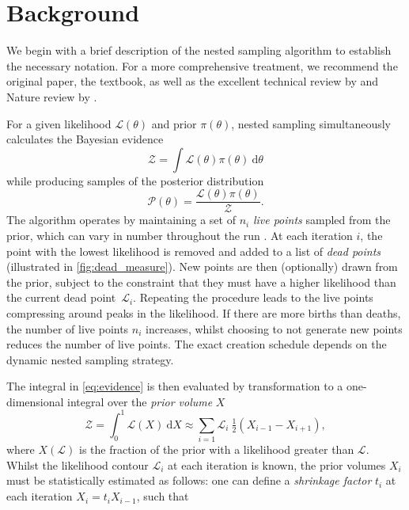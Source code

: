 \documentclass[usenatbib]{mnras}
\newcommand{\nlive}{n_i}
\begin{document}
\section{Background}\label{sec:background}
We begin with a brief description of the nested sampling algorithm to establish the necessary notation. For a more comprehensive treatment, we recommend the original \citep{skilling} paper, the \citet{sivia} textbook, as well as the excellent technical review by \citet{Buchner_2023} and Nature review by \citet{physical_scientists}. 
\par
For a given likelihood $\mathcal{L}(\theta)$ and prior $\pi(\theta)$, nested sampling simultaneously calculates the Bayesian evidence
\begin{equation}\label{eq:evidence}
	\mathcal{Z} = \int \mathcal{L}\left(\theta\right)\pi(\theta)\ \mathrm{d}\theta
\end{equation}
while producing samples of the posterior distribution
\begin{equation}
	\mathcal{P}(\theta) = \frac{\mathcal{L}(\theta) \pi(\theta)}{\mathcal{Z}}.
\end{equation}
The algorithm operates by maintaining a set of $\nlive$ \textit{live points} sampled from the prior, which can vary in number throughout the run \citep{dynamic_ns}. At each iteration $i$, the point with the lowest likelihood is removed and added to a list of \textit{dead points} (illustrated in \cref{fig:dead_measure}). New points are then (optionally) drawn from the prior, subject to the constraint that they must have a higher likelihood than the current dead point~$\mathcal{L}_i$. Repeating the procedure leads to the live points compressing around peaks in the likelihood. If there are more births than deaths, the number of live points $n_i$ increases, whilst choosing to not generate new points reduces the number of live points. The exact creation schedule depends on the dynamic nested sampling strategy.
\par
The integral in \cref{eq:evidence} is then evaluated by transformation to a one-dimensional integral over the \textit{prior volume} $X$
\begin{equation}
	\mathcal{Z} = \int_0^1 \mathcal{L}(X)\ \mathrm{d}X \approx \sum_{i=1} \mathcal{L}_i\ \tfrac{1}{2}(X_{i-1}-X_{i+1}),
\end{equation}
where $X(\mathcal{L})$ is the fraction of the prior with a likelihood greater than $\mathcal{L}$. Whilst the likelihood contour $\mathcal{L}_i$ at each iteration is known, the prior volumes $X_i$ must be statistically estimated as follows: one can define a \textit{shrinkage factor} $t_i$ at each iteration $X_{i} = t_i X_{i-1}$, such that
\end{document}

